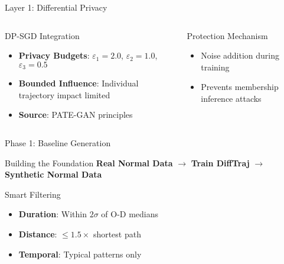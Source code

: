 \documentclass[aspectratio=169,xcolor={dvipsnames}]{beamer}
\begin{document}
\begin{frame}{Layer 1: Differential Privacy}
  \begin{columns}
    \begin{column}{0.5\textwidth}
      \begin{block}{DP-SGD Integration}
        \begin{itemize}
          \item \textbf{Privacy Budgets}: $\varepsilon_1=2.0$, $\varepsilon_2=1.0$, $\varepsilon_3=0.5$
          \item \textbf{Bounded Influence}: Individual trajectory impact limited
          \item \textbf{Source}: PATE-GAN principles
        \end{itemize}
      \end{block}
    \end{column}
    \begin{column}{0.5\textwidth}
      \begin{block}{Protection Mechanism}
        \begin{itemize}
          \item Noise addition during training
          \item Prevents membership inference attacks
        \end{itemize}
      \end{block}
    \end{column}
  \end{columns}
\end{frame}

\begin{frame}{Phase 1: Baseline Generation}
  \begin{block}{Building the Foundation}
    \centering
    \textbf{Real Normal Data} $\rightarrow$ \textbf{Train DiffTraj} $\rightarrow$ \textbf{Synthetic Normal Data}
  \end{block}
  
  \vspace{1em}
  \begin{block}{Smart Filtering}
    \begin{itemize}
      \item \textbf{Duration}: Within $2\sigma$ of O-D medians
      \item \textbf{Distance}: $\leq 1.5 \times$ shortest path
      \item \textbf{Temporal}: Typical patterns only
    \end{itemize}
  \end{block}
\end{frame}
\end{document}
